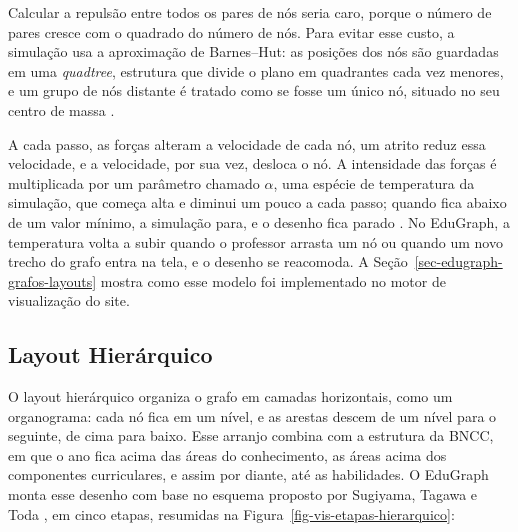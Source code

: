 Calcular a repulsão entre todos os pares de nós seria caro, porque o número de pares cresce com o quadrado do número de nós. Para evitar esse custo, a simulação usa a aproximação de Barnes--Hut: as posições dos nós são guardadas em uma \textit{quadtree}, estrutura que divide o plano em quadrantes cada vez menores, e um grupo de nós distante é tratado como se fosse um único nó, situado no seu centro de massa \cite{bostock2026d3force}.

A cada passo, as forças alteram a velocidade de cada nó, um atrito reduz essa velocidade, e a velocidade, por sua vez, desloca o nó. A intensidade das forças é multiplicada por um parâmetro chamado $\alpha$, uma espécie de temperatura da simulação, que começa alta e diminui um pouco a cada passo; quando fica abaixo de um valor mínimo, a simulação para, e o desenho fica parado \cite{bostock2026d3force}. No EduGraph, a temperatura volta a subir quando o professor arrasta um nó ou quando um novo trecho do grafo entra na tela, e o desenho se reacomoda. A Seção~\ref{sec-edugraph-grafos-layouts} mostra como esse modelo foi implementado no motor de visualização do site.


\subsection{Layout Hierárquico}
\label{sec-referencial-visualizacao-hierarquico}

O layout hierárquico organiza o grafo em camadas horizontais, como um organograma: cada nó fica em um nível, e as arestas descem de um nível para o seguinte, de cima para baixo. Esse arranjo combina com a estrutura da BNCC, em que o ano fica acima das áreas do conhecimento, as áreas acima dos componentes curriculares, e assim por diante, até as habilidades. O EduGraph monta esse desenho com base no esquema proposto por Sugiyama, Tagawa e Toda , em cinco etapas, resumidas na Figura~\ref{fig-vis-etapas-hierarquico}:

